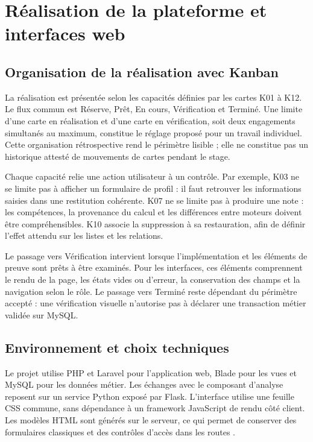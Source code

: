 \chapter{Réalisation de la plateforme et interfaces web}
\label{chap:realisation}

\section{Organisation de la réalisation avec Kanban}
La réalisation est présentée selon les capacités définies par les cartes K01 à K12. Le flux commun est Réserve, Prêt, En cours, Vérification et Terminé. Une limite d'une carte en réalisation et d'une carte en vérification, soit deux engagements simultanés au maximum, constitue le réglage proposé pour un travail individuel. Cette organisation rétrospective rend le périmètre lisible ; elle ne constitue pas un historique attesté de mouvements de cartes pendant le stage.

Chaque capacité relie une action utilisateur à un contrôle. Par exemple, K03 ne se limite pas à afficher un formulaire de profil : il faut retrouver les informations saisies dans une restitution cohérente. K07 ne se limite pas à produire une note : les compétences, la provenance du calcul et les différences entre moteurs doivent être compréhensibles. K10 associe la suppression à sa restauration, afin de définir l'effet attendu sur les listes et les relations.

Le passage vers Vérification intervient lorsque l'implémentation et les éléments de preuve sont prêts à être examinés. Pour les interfaces, ces éléments comprennent le rendu de la page, les états vides ou d'erreur, la conservation des champs et la navigation selon le rôle. Le passage vers Terminé reste dépendant du périmètre accepté : une vérification visuelle n'autorise pas à déclarer une transaction métier validée sur MySQL.

\section{Environnement et choix techniques}
Le projet utilise PHP et Laravel pour l'application web, Blade pour les vues et MySQL pour les données métier. Les échanges avec le composant d'analyse reposent sur un service Python exposé par Flask. L'interface utilise une feuille CSS commune, sans dépendance à un framework JavaScript de rendu côté client. Les modèles HTML sont générés sur le serveur, ce qui permet de conserver des formulaires classiques et des contrôles d'accès dans les routes \cite{laravel-routing,laravel-validation}.

